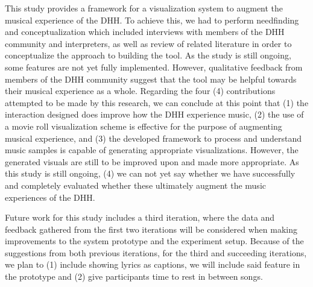 This study provides a framework for a visualization system to augment the musical experience of the DHH. To achieve this, we had to perform needfinding and conceptualization which included interviews with members of the DHH community and interpreters, as well as review of related literature in order to conceptualize the approach to building the tool. As the study is still ongoing, some features are not yet fully implemented. However, qualitative feedback from members of the DHH community suggest that the tool may be helpful towards their musical experience as a whole. Regarding the four (4) contributions attempted to be made by this research, we can conclude at this point that (1) the interaction designed does improve how the DHH experience music, (2) the use of a movie roll visualization scheme is effective for the purpose of augmenting musical experience, and (3) the developed framework to process and understand music samples is capable of generating appropriate visualizations. However, the generated visuals are still to be improved upon and made more appropriate. As this study is still ongoing, (4) we can not yet say whether we have successfully and completely evaluated whether these ultimately augment the music experiences of the DHH.

Future work for this study includes a third iteration, where the data and feedback gathered from the first two iterations will be considered when making improvements to the system prototype and the experiment setup. Because of the suggestions from both previous iterations, for the third and succeeding iterations, we plan to (1) include showing lyrics as captions, we will include said feature in the prototype and (2) give participants time to rest in between songs. %

